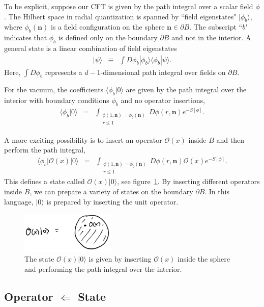 \documentclass[11pt]{ws-rv9x6}
\newcommand\be{\begin{eqnarray}}
\newcommand\ee{\end{eqnarray}}
\newcommand\cO{\mathcal{O}}
\newcommand\ptl\partial
\newcommand\<\langle
\renewcommand\>\rangle
\renewcommand\.{\cdot}
\newcommand\bn{\mathbf{n}}
\begin{document}
To be explicit, suppose our CFT is given by the path integral over a scalar field $\phi$.  The Hilbert space in radial quantization is spanned by ``field eigenstates" $|\phi_b\>$, where $\phi_b(\bn)$ is a field configuration on the sphere $\bn\in \ptl B$.  The subscript ``$b$" indicates that $\phi_b$ is defined only on the boundary $\ptl B$ and not in the interior.  A general state is a linear combination of field eigenstates
\be
|\psi\> &\equiv& \int D\phi_b |\phi_b\>\<\phi_b|\psi\>.
\ee
Here, $\int D\phi_b$ represents a $d-1$-dimensional path integral over fields on $\ptl B$.

For the vacuum, the coefficients $\<\phi_b|0\>$ are given by the path integral over the interior with boundary conditions $\phi_b$ and no operator insertions,
\be
\<\phi_b |0\> &=&  \int_{\substack{\phi(1,\bn)=\phi_b(\bn) \\ r \leq 1}} D\phi(r,\bn) e^{-S[\phi]}.
\ee

A more exciting possibility is to insert an operator $\cO(x)$ inside $B$ and then perform the path integral,
\be
\<\phi_b|\cO(x)|0\> &=& \int_{\substack{\phi(1,\bn)=\phi_b(\bn) \\ r \leq 1}} D\phi(r,\bn) \cO(x) e^{-S[\phi]}.
\ee
This defines a state called $\cO(x)|0\>$, see figure~\ref{fig:radialexcited}.
By inserting different operators inside $B$, we can prepare a variety of states on the boundary $\ptl B$. In this language, $|0\>$ is prepared by inserting the unit operator.

\begin{figure}
\begin{center}
\includegraphics[width=0.4\textwidth]{radialexcited.jpg}
\end{center}
\caption{The state $\cO(x)|0\>$ is given by inserting $\cO(x)$ inside the sphere and performing the path integral over the interior.  \label{fig:radialexcited}}
\end{figure}

\subsection{Operator $\Longleftarrow$ State}
\end{document}

